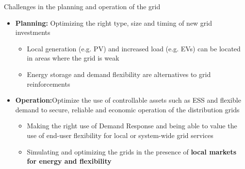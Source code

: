 \documentclass{beamer}
\begin{document}
\begin{frame}{Challenges in the planning and operation of the grid}
\begin{itemize}
\item \textbf{Planning:} Optimizing the right type, size and timing of new grid investments
\begin{itemize}
\item Local generation (e.g. PV) and increased load (e.g. EVs)  can be located in areas where the grid is weak
\item Energy storage and demand flexibility are alternatives to grid reinforcements
\end{itemize}

\item \textbf{Operation:}Optimize the use of controllable assets such as ESS and flexible demand to secure, reliable and economic operation of the distribution grids
\begin{itemize}
\item Making the right use of Demand Response and being able to value the use of end-user flexibility for local or system-wide grid services
\item Simulating and optimizing the grids in the presence of \textbf{local markets for energy and flexibility}
\end{itemize}
\end{itemize}
\end{frame}
\end{document}
